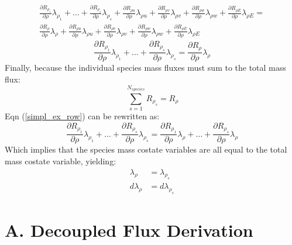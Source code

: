\documentclass{article}   	%
\begin{document}
\begin{multline}
  \frac{\partial R_{\rho_1}}{\partial \rho}\lambda_{\rho_1} +
  \dots +
  \frac{\partial R_{\rho_s}}{\partial \rho}\lambda_{\rho_s} +
  \frac{\partial R_{\rho u}}{\partial \rho}\lambda_{\rho u} +
  \frac{\partial R_{\rho v}}{\partial \rho}\lambda_{\rho v} +
  \frac{\partial R_{\rho w}}{\partial \rho}\lambda_{\rho w} +
  \frac{\partial R_{\rho E}}{\partial \rho}\lambda_{\rho E} = \\
  \frac{\partial R_{\rho}}{\partial \rho}\lambda_{\rho} +
  \frac{\partial R_{\rho u}}{\partial \rho}\lambda_{\rho u} +
  \frac{\partial R_{\rho v}}{\partial \rho}\lambda_{\rho v} +
  \frac{\partial R_{\rho w}}{\partial \rho}\lambda_{\rho w} +
  \frac{\partial R_{\rho E}}{\partial \rho}\lambda_{\rho E}
  \label{expand_row}
\end{multline}
\begin{equation}
  \frac{\partial R_{\rho_1}}{\partial \rho}\lambda_{\rho_1} +
  \dots +
  \frac{\partial R_{\rho_s}}{\partial \rho}\lambda_{\rho_s} =
  \frac{\partial R_{\rho}}{\partial \rho}\lambda_{\rho}
  \label{simpl_ex_row}
\end{equation}
Finally, because the individual species mass fluxes must sum to the total mass flux:
\begin{equation}
  \sum_{s=1}^{N_{species}}{R_{\rho_s}} = R_{\rho}
  \label{sp_sum}
\end{equation}
Eqn (\ref{simpl_ex_row}) can be rewritten as:
\begin{equation}
  \frac{\partial R_{\rho_1}}{\partial \rho}\lambda_{\rho_1} +
  \dots +
  \frac{\partial R_{\rho_s}}{\partial \rho}\lambda_{\rho_s} =
  \frac{\partial R_{\rho_1}}{\partial \rho}\lambda_{\rho} +
  \dots +
  \frac{\partial R_{\rho_s}}{\partial \rho}\lambda_{\rho}
  \label{near_final}
\end{equation}
Which implies that the species mass costate variables are all equal to the total mass costate variable, yielding:
\begin{align}
  \lambda_{\rho} &= \lambda_{\rho_s} \\
  d \lambda_{\rho} &= d \lambda_{\rho_s}
  \label{final_result}
\end{align}
\pagebreak
\section*{A. Decoupled Flux Derivation}
\end{document}
